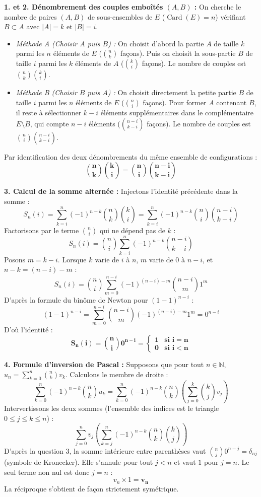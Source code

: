\documentclass[11pt,a4paper]{article}
\newcommand{\N}{\mathbb{N}}
\begin{document}
\begin{correctionbox}
\textbf{1. et 2. Dénombrement des couples emboîtés $(A, B)$ :}
On cherche le nombre de paires $(A, B)$ de sous-ensembles de $E$ ($\operatorname{Card}(E) = n$) vérifiant $B \subset A$ avec $|A| = k$ et $|B| = i$.
\begin{itemize}[label=$\bullet$]
    \item \emph{Méthode A (Choisir $A$ puis $B$) :} On choisit d'abord la partie $A$ de taille $k$ parmi les $n$ éléments de $E$ ($\binom{n}{k}$ façons). Puis on choisit la sous-partie $B$ de taille $i$ parmi les $k$ éléments de $A$ ($\binom{k}{i}$ façons).
    Le nombre de couples est $\binom{n}{k} \binom{k}{i}$.
    \item \emph{Méthode B (Choisir $B$ puis $A$) :} On choisit directement la petite partie $B$ de taille $i$ parmi les $n$ éléments de $E$ ($\binom{n}{i}$ façons). Pour former $A$ contenant $B$, il reste à sélectionner $k - i$ éléments supplémentaires dans le complémentaire $E \setminus B$, qui compte $n - i$ éléments ($\binom{n-i}{k-i}$ façons).
    Le nombre de couples est $\binom{n}{i} \binom{n-i}{k-i}$.
\end{itemize}
Par identification des deux dénombrements du même ensemble de configurations :
\[
\mathbf{\binom{n}{k} \binom{k}{i} = \binom{n}{i} \binom{n-i}{k-i}}
\]

\textbf{3. Calcul de la somme alternée :}
Injectons l'identité précédente dans la somme :
\[
S_n(i) = \sum_{k=i}^n (-1)^{n-k} \binom{n}{k} \binom{k}{i} = \sum_{k=i}^n (-1)^{n-k} \binom{n}{i} \binom{n-i}{k-i}
\]
Factorisons par le terme $\binom{n}{i}$ qui ne dépend pas de $k$ :
\[
S_n(i) = \binom{n}{i} \sum_{k=i}^n (-1)^{n-k} \binom{n-i}{k-i}
\]
Posons $m = k - i$. Lorsque $k$ varie de $i$ à $n$, $m$ varie de $0$ à $n - i$, et $n - k = (n - i) - m$ :
\[
S_n(i) = \binom{n}{i} \sum_{m=0}^{n-i} (-1)^{(n-i) - m} \binom{n-i}{m} 1^m
\]
D'après la formule du binôme de Newton pour $(1 - 1)^{n-i}$ :
\[
(1 - 1)^{n-i} = \sum_{m=0}^{n-i} \binom{n-i}{m} (-1)^{(n-i) - m} 1^m = 0^{n-i}
\]
D'où l'identité :
\[
\mathbf{S_n(i) = \binom{n}{i} 0^{n-i} = \begin{cases} 1 & \text{si } i = n \\ 0 & \text{si } i < n \end{cases}}
\]

\textbf{4. Formule d'inversion de Pascal :}
Supposons que pour tout $n \in \N$, $u_n = \sum_{k=0}^n \binom{n}{k} v_k$.
Calculons le membre de droite :
\[
\sum_{k=0}^n (-1)^{n-k} \binom{n}{k} u_k = \sum_{k=0}^n (-1)^{n-k} \binom{n}{k} \left( \sum_{j=0}^k \binom{k}{j} v_j \right)
\]
Intervertissons les deux sommes (l'ensemble des indices est le triangle $0 \le j \le k \le n$) :
\[
\sum_{j=0}^n v_j \left( \sum_{k=j}^n (-1)^{n-k} \binom{n}{k} \binom{k}{j} \right)
\]
D'après la question 3, la somme intérieure entre parenthèses vaut $\binom{n}{j} 0^{n-j} = \delta_{nj}$ (symbole de Kronecker).
Elle s'annule pour tout $j < n$ et vaut $1$ pour $j = n$.
Le seul terme non nul est donc $j = n$ :
\[
v_n \times 1 = \mathbf{v_n}
\]
La réciproque s'obtient de façon strictement symétrique.
\end{correctionbox}
\end{document}
